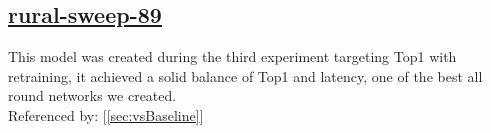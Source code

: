 \documentclass[11pt]{report}
\begin{document}
\subsection*{\protect\href{https://wandb.ai/samfh/Resnet56-Channels-Filters/runs/drh6012i/overview?workspace=}{\underline{\color{blue}rural-sweep-89}}}\label{sec:rural-sweep-89}
This model was created during the third experiment targeting Top1 with retraining, it achieved a solid balance of Top1 and latency, one of the best all round networks we created.\\
Referenced by: [\ref{sec:vsBaseline}]
\singlespacing
\begin{figure}[H]
    \begin{table}[H]
        \centering
        \hspace{2em}
    \end{table}    
\end{figure}
\doublespacing
\newpage
\end{document}
